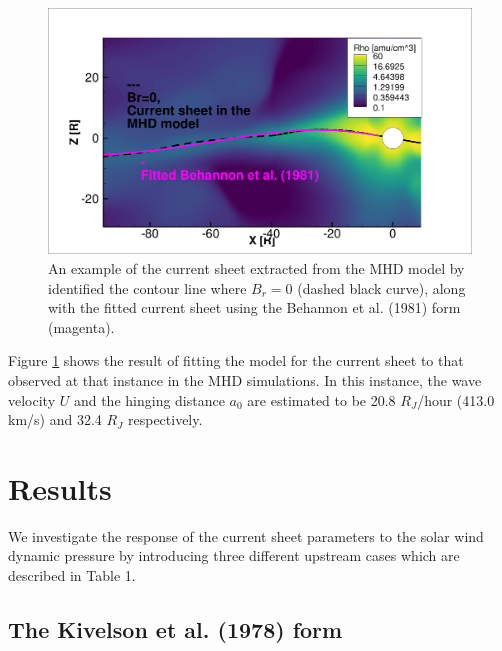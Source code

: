 \begin{figure}
    \centering
    \includegraphics[width=\textwidth]{images5/CurrentSheet_fitted.png}
    \caption{An example of the current sheet extracted from the MHD model  by identified the contour line where $B_r=0$ (dashed black curve), along with the fitted current sheet using the Behannon et al. (1981) form (magenta).}
    \label{fig:example-fitcurrentsheet}
\end{figure}

Figure \ref{fig:example-fitcurrentsheet} shows the result of fitting the  model for the current sheet to that observed at that instance in the MHD simulations. In this instance, the wave velocity $U$ and the hinging distance $a_0$ are estimated to be 20.8 $R_J$/hour (413.0 km/s) and 32.4 $R_J$ respectively. 

\section{Results}

We investigate the response of the current sheet parameters to the solar wind dynamic pressure by introducing three different upstream cases which are described in Table 1. 

\subsection{The Kivelson et al. (1978) form}

